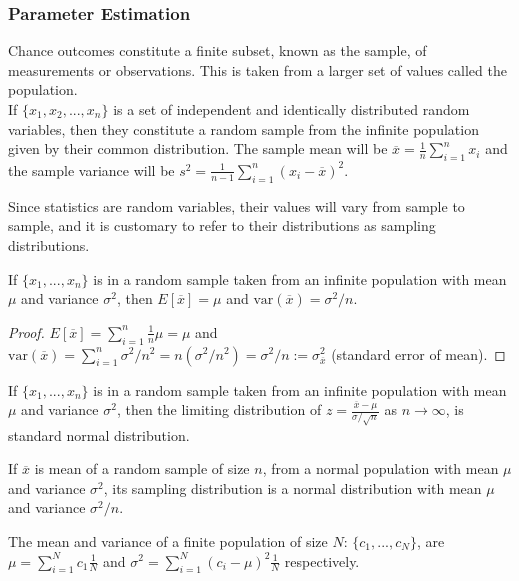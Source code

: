\documentclass[a4paper]{article}
\begin{document}
\subsubsection*{Parameter Estimation~\cite{hughes2010measurements}}
\begin{defi}
Chance outcomes constitute a finite subset, known as the sample, of measurements or observations. This is taken from a larger set of values called the population.\\[5pt]
If $\{x_1,x_2,...,x_n\}$ is a set of independent and identically distributed random variables, then they constitute a random sample from the infinite population given by their common distribution. The sample mean will be $\overline{x}=\frac{1}{n}\sum_{i=1}^nx_i$ and the sample variance will be $s^2=\frac{1}{n-1}\sum_{i=1}^n(x_i-\overline{x})^2$.
\end{defi}
\begin{defi}
Since statistics are random variables, their values will vary from sample to sample, and it is customary to refer to their distributions as sampling distributions.
\end{defi}
\begin{thm}
If $\{x_1,...,x_n\}$ is in a random sample taken from an infinite population with mean $\mu$ and variance $\sigma^2$, then $E[\overline{x}]=\mu$ and $\text{var}(\overline{x})=\sigma^2/n$.
\end{thm}
\begin{proof}
$E[\overline{x}]=\sum_{i=1}^n\frac{1}{n}\mu=\mu$ and $\text{var}(\overline{x})=\sum_{i=1}^n\sigma^2/n^2=n(\sigma^2/n^2)=\sigma^2/n:=\sigma_{\overline{x}}^2$ (standard error of mean).
\end{proof}
\begin{thm}
If $\{x_1,...,x_n\}$ is in a random sample taken from an infinite population with mean $\mu$ and variance $\sigma^2$, then the limiting distribution of $z=\frac{\overline{x}-\mu}{\sigma/\sqrt{n}}$ as $n\rightarrow\infty$, is standard normal distribution.
\end{thm}
\begin{thm}
If $\overline{x}$ is mean of a random sample of size $n$, from a normal population with mean $\mu$ and variance $\sigma^2$, its sampling distribution is a normal distribution with mean $\mu$ and variance $\sigma^2/n$.
\end{thm}
\begin{thm}
The mean and variance of a finite population of size $N$: $\{c_1,...,c_N\}$, are $\mu=\sum_{i=1}^Nc_1\frac{1}{N}$ and $\sigma^2=\sum_{i=1}^N(c_i-\mu)^2\frac{1}{N}$ respectively.
\end{thm}
\end{document}
